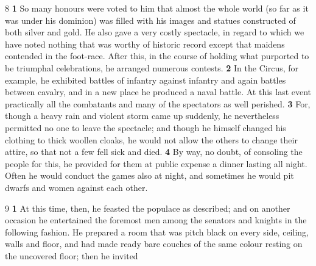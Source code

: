 8 \textbf{1} So many honours were voted to him that almost the whole world (so far as it was under his dominion) was filled with his images and statues constructed of both silver and gold. He also gave a very costly spectacle, in regard to which we have noted nothing that was worthy of historic record except that maidens contended in the foot-race. After this, in the course of holding what purported to be triumphal celebrations, he arranged numerous contests. \textbf{2} In the Circus, for example, he exhibited battles of infantry against infantry and again battles between cavalry, and in a new place he produced a naval battle. At this last event practically all the combatants and many of the spectators as well perished. \textbf{3} For, though a heavy rain and violent storm came up suddenly, he nevertheless permitted no one to leave the spectacle; and though he himself changed his clothing to thick woollen cloaks, he would not allow the others to change their attire, so that not a few fell sick and died. \textbf{4} By way, no doubt, of consoling the people for this, he provided for them at public expense a dinner lasting all night. Often he would conduct the games also at night, and sometimes he would pit dwarfs and women against each other.

9 \textbf{1} At this time, then, he feasted the populace as described; and on another occasion he entertained the foremost men among the senators and knights in the following fashion. He prepared a room that was pitch black on every side, ceiling, walls and floor, and had made ready bare couches of the same colour resting on the uncovered floor; then he invited

